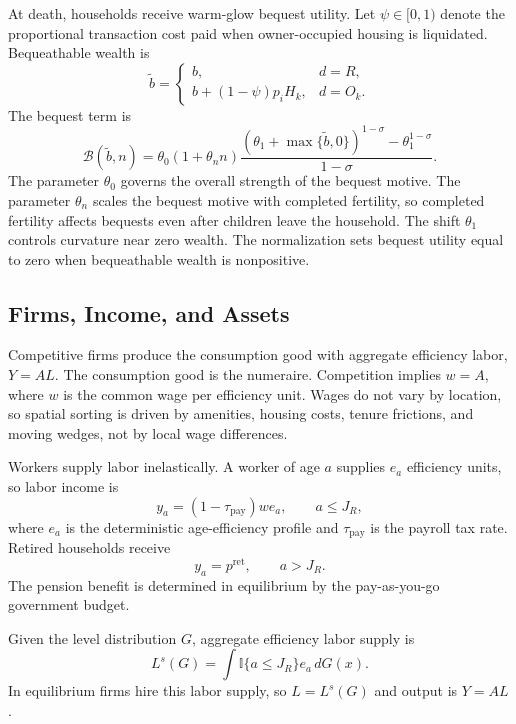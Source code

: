 \documentclass[11pt]{article}
\newcommand{\ind}{\mathbb{I}}
\begin{document}
At death, households receive warm-glow bequest utility. Let $\psi\in[0,1)$ denote the proportional transaction cost paid when owner-occupied housing is liquidated. Bequeathable wealth is
\begin{equation*}
    \widetilde b =
    \begin{cases}
    b, & d=R,\\
    b+(1-\psi)p_iH_k, & d=O_k.
    \end{cases}
\end{equation*}
The bequest term is
\begin{equation}
\mathcal B(\widetilde b,n)
=
\theta_0(1+\theta_n n)
\frac{
(\theta_1+\max\{\widetilde b,0\})^{1-\sigma}
-\theta_1^{1-\sigma}
}{1-\sigma}.
\label{eq:bequest}
\end{equation}
The parameter $\theta_0$ governs the overall strength of the bequest motive. The parameter $\theta_n$ scales the bequest motive with completed fertility, so completed fertility affects bequests even after children leave the household. The shift $\theta_1$ controls curvature near zero wealth. The normalization sets bequest utility equal to zero when bequeathable wealth is nonpositive.

\subsection{Firms, Income, and Assets}

Competitive firms produce the consumption good with aggregate efficiency labor, $Y=A L$. The consumption good is the numeraire. Competition implies $w=A$, where $w$ is the common wage per efficiency unit. Wages do not vary by location, so spatial sorting is driven by amenities, housing costs, tenure frictions, and moving wedges, not by local wage differences.

Workers supply labor inelastically. A worker of age $a$ supplies $e_a$ efficiency units, so labor income is
\begin{equation*}
    y_a=(1-\tau_{\mathrm{pay}})w e_a,
    \qquad a\leq J_R,
\end{equation*}
where $e_a$ is the deterministic age-efficiency profile and $\tau_{\mathrm{pay}}$ is the payroll tax rate. Retired households receive
\begin{equation*}
    y_a=p^{\mathrm{ret}},
    \qquad a>J_R.
\end{equation*}
The pension benefit is determined in equilibrium by the pay-as-you-go government budget.

Given the level distribution $G$, aggregate efficiency labor supply is
\begin{equation*}
    L^s(G)=\int \ind\{a\leq J_R\}e_a\,dG(x).
\end{equation*}
In equilibrium firms hire this labor supply, so $L=L^s(G)$ and output is $Y=A L$.
\end{document}
